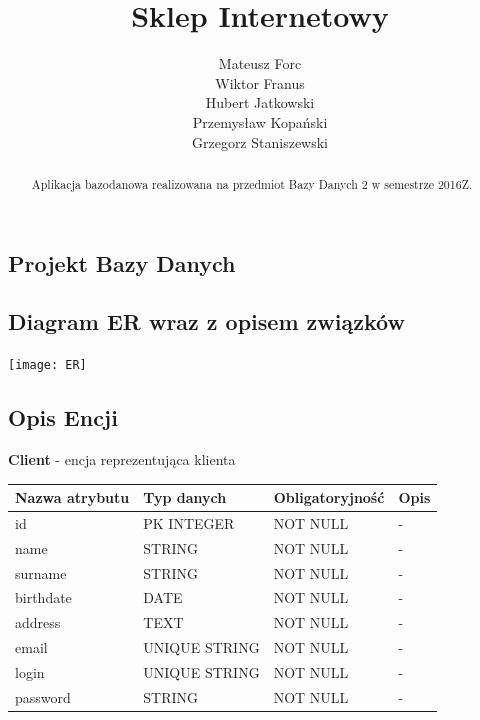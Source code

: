 \documentclass[10pt,a4paper]{article}
\author{
  \small Mateusz Forc\\
  \small Wiktor Franus\\
  \small Hubert Jatkowski\\
  \small Przemysław Kopański\\
  \small Grzegorz Staniszewski\\
}
\title{Sklep Internetowy}
\begin{document}
  \maketitle
  \begin{abstract}
    \begin{center}
    Aplikacja bazodanowa realizowana na przedmiot Bazy Danych 2 w semestrze 2016Z.
    \end{center}
  \end{abstract}
  \tableofcontents
  \newpage
  \begin{landscape}
  \pagestyle{empty}
  \section{Projekt Bazy Danych}
  
    \subsection{Diagram ER wraz z opisem związków}
      \begin{center}
        \texttt{[image: ER]}
      \end{center}
   \end{landscape}
    
    \newpage 
    \subsection{Opis Encji}
     \textbf{Client} - encja reprezentująca klienta
      \begin{center}
        \begin{tabular}{| m{3cm} | m{3cm} | m{3cm} | m{3cm} |}
          \hline
          Nazwa atrybutu & Typ danych & Obligatoryjność & Opis\\ \hline
		  id        & PK INTEGER    & NOT NULL 		    & -\\ \hline
		  name      & STRING        & NOT NULL 			& -\\ \hline
		  surname   & STRING        & NOT NULL 			& -\\ \hline
		  birthdate & DATE          & NOT NULL 			& -\\ \hline
		  address   & TEXT          & NOT NULL 			& -\\ \hline
		  email     & UNIQUE STRING & NOT NULL 			& -\\ \hline
		  login     & UNIQUE STRING & NOT NULL 			& -\\ \hline
		  password  & STRING        & NOT NULL 			& -\\ \hline
		\end{tabular}
	  \end{center}
\end{document}
